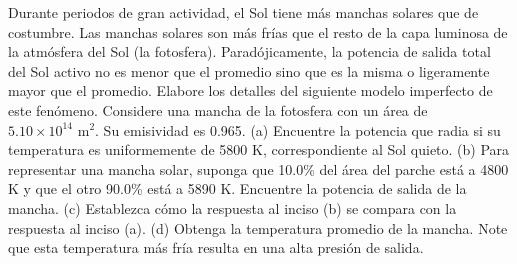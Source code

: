 \item Durante periodos de gran actividad, el Sol tiene más manchas solares que de costumbre. Las manchas solares son más frías que el resto de la capa luminosa de la atmósfera del Sol (la fotosfera). Paradójicamente, la potencia de salida total del Sol activo no es menor que el promedio sino que es la misma o ligeramente mayor que el promedio. Elabore los detalles del siguiente modelo imperfecto de este fenómeno. Considere una mancha de la fotosfera con un área de $5.10 \times 10^{14}\text{ m}^2$. Su emisividad es 0.965. (a) Encuentre la potencia que radia si su temperatura es uniformemente de 5800 K, correspondiente al Sol quieto. (b) Para representar una mancha solar, suponga que 10.0\% del área del parche está a 4800 K y que el otro 90.0\% está a 5890 K. Encuentre la potencia de salida de la mancha. (c) Establezca cómo la respuesta al inciso (b) se compara con la respuesta al inciso (a). (d) Obtenga la temperatura promedio de la mancha. Note que esta temperatura más fría resulta en una alta presión de salida.
